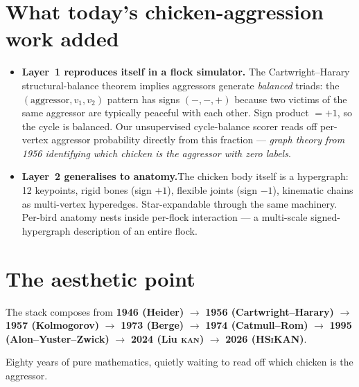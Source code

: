 \documentclass[11pt,a4paper]{article}
\newcommand{\KAN}{\textsc{kan}}
\newcommand{\HSiKAN}{\textsc{HSiKAN}}
\begin{document}
\section*{What today's chicken-aggression work added}

\begin{itemize}
\item \textbf{Layer~1 reproduces itself in a flock simulator.}\;
  The Cartwright--Harary structural-balance theorem implies
  aggressors generate \emph{balanced} triads: the
  $(\mathrm{aggressor}, v_1, v_2)$ pattern has signs $(-, -, +)$
  because two victims of the same aggressor are typically
  peaceful with each other.  Sign product $= +1$, so the cycle
  is balanced.  Our unsupervised cycle-balance scorer reads off
  per-vertex aggressor probability directly from this fraction
  --- \emph{graph theory from 1956 identifying which chicken is
  the aggressor with zero labels}.
\item \textbf{Layer~2 generalises to anatomy.}\;The chicken body
  itself is a hypergraph: 12 keypoints, rigid bones (sign $+1$),
  flexible joints (sign $-1$), kinematic chains as multi-vertex
  hyperedges.  Star-expandable through the same machinery.
  Per-bird anatomy nests inside per-flock interaction --- a
  multi-scale signed-hypergraph description of an entire flock.
\end{itemize}

\section*{The aesthetic point}

The stack composes from
\textbf{1946 (Heider)} $\to$
\textbf{1956 (Cartwright--Harary)} $\to$
\textbf{1957 (Kolmogorov)} $\to$
\textbf{1973 (Berge)} $\to$
\textbf{1974 (Catmull--Rom)} $\to$
\textbf{1995 (Alon--Yuster--Zwick)} $\to$
\textbf{2024 (Liu \KAN)} $\to$
\textbf{2026 (\HSiKAN)}.

\medskip
\noindent
Eighty years of pure mathematics, quietly waiting to read off
which chicken is the aggressor.
\end{document}
